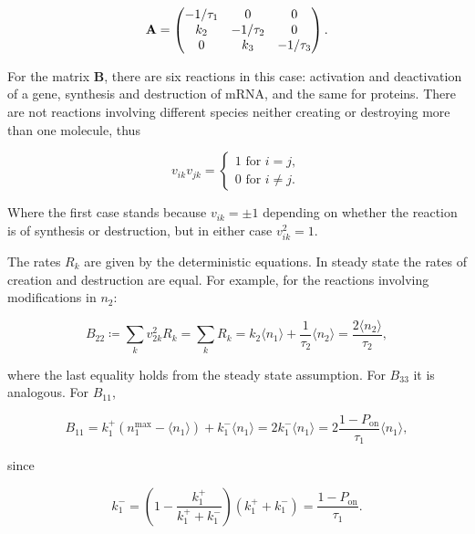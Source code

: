 \begin{equation}
  \label{eq:fdt-A}
  \mathbf{A} = \begin{pmatrix}
    -1/\tau_1 & 0 & 0 \\
    k_2 & -1/\tau_2 & 0 \\
    0 & k_3 & -1/\tau_3
  \end{pmatrix}.\\
\end{equation}

For the matrix $\mathbf{B}$, there are six reactions in this case: activation and deactivation of a gene, synthesis and destruction of mRNA, and the same for proteins. There are not reactions involving different species neither creating or destroying more than one molecule, thus

\begin{equation*}
  v_{ik}v_{jk} = 
  \begin{cases}
    1 \text{ for } i = j,\\
    0 \text{ for } i\neq j.
  \end{cases}
\end{equation*}

Where the first case stands because  $v_{ik} =\pm 1$ depending on whether the reaction is of synthesis or destruction, but in either case $v_{ik}^2 = 1$.

The rates $R_k$ are given by the deterministic equations. In steady state the rates of creation and destruction are equal. For example, for the reactions involving modifications in $n_2$:

\begin{equation*}
  B_{22} \coloneqq \sum_kv_{2k}^2R_k = \sum_kR_k = k_2\langle n_1\rangle + \frac{1}{\tau_2}\langle n_2\rangle = \frac{2\langle n_2\rangle}{\tau_2},
\end{equation*}

where the last equality holds from the steady state assumption. For $B_{33}$ it is analogous. For $B_{11}$,

\begin{equation*}
  B_{11} = k_1^+(n_1^\text{max}-\langle n_1\rangle)+k_1^-\langle n_1\rangle = 2k_1^-\langle n_1\rangle = 2\frac{1-P_\text{on}}{\tau_1}\langle n_1\rangle,
\end{equation*}

since

\begin{equation*}
  k_1^- = \left(1-\frac{k_1^+}{k_1^++k_1^-}\right)(k_1^++k_1^-)=\frac{1-P_\text{on}}{\tau_1}.
\end{equation*}

